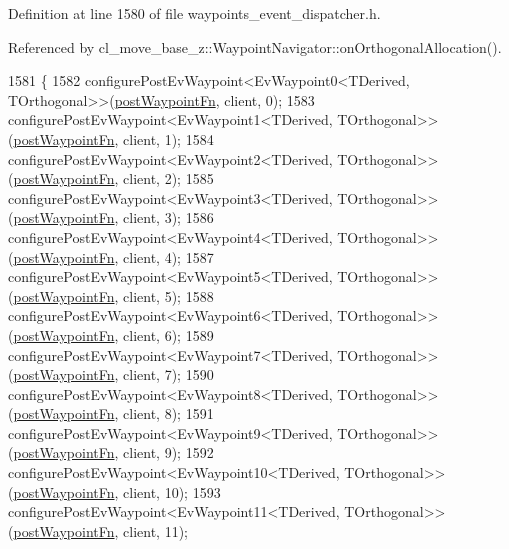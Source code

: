 Definition at line 1580 of file waypoints\+\_\+event\+\_\+dispatcher.\+h.



Referenced by cl\+\_\+move\+\_\+base\+\_\+z\+::\+Waypoint\+Navigator\+::on\+Orthogonal\+Allocation().


\begin{DoxyCode}
1581 \{
1582     configurePostEvWaypoint<EvWaypoint0<TDerived, TOrthogonal>>(\hyperlink{classcl__move__base__z_1_1WaypointEventDispatcher_a964a57fcce5d48ec60243230722d8dd7}{postWaypointFn}, client, 0);
1583     configurePostEvWaypoint<EvWaypoint1<TDerived, TOrthogonal>>(\hyperlink{classcl__move__base__z_1_1WaypointEventDispatcher_a964a57fcce5d48ec60243230722d8dd7}{postWaypointFn}, client, 1);
1584     configurePostEvWaypoint<EvWaypoint2<TDerived, TOrthogonal>>(\hyperlink{classcl__move__base__z_1_1WaypointEventDispatcher_a964a57fcce5d48ec60243230722d8dd7}{postWaypointFn}, client, 2);
1585     configurePostEvWaypoint<EvWaypoint3<TDerived, TOrthogonal>>(\hyperlink{classcl__move__base__z_1_1WaypointEventDispatcher_a964a57fcce5d48ec60243230722d8dd7}{postWaypointFn}, client, 3);
1586     configurePostEvWaypoint<EvWaypoint4<TDerived, TOrthogonal>>(\hyperlink{classcl__move__base__z_1_1WaypointEventDispatcher_a964a57fcce5d48ec60243230722d8dd7}{postWaypointFn}, client, 4);
1587     configurePostEvWaypoint<EvWaypoint5<TDerived, TOrthogonal>>(\hyperlink{classcl__move__base__z_1_1WaypointEventDispatcher_a964a57fcce5d48ec60243230722d8dd7}{postWaypointFn}, client, 5);
1588     configurePostEvWaypoint<EvWaypoint6<TDerived, TOrthogonal>>(\hyperlink{classcl__move__base__z_1_1WaypointEventDispatcher_a964a57fcce5d48ec60243230722d8dd7}{postWaypointFn}, client, 6);
1589     configurePostEvWaypoint<EvWaypoint7<TDerived, TOrthogonal>>(\hyperlink{classcl__move__base__z_1_1WaypointEventDispatcher_a964a57fcce5d48ec60243230722d8dd7}{postWaypointFn}, client, 7);
1590     configurePostEvWaypoint<EvWaypoint8<TDerived, TOrthogonal>>(\hyperlink{classcl__move__base__z_1_1WaypointEventDispatcher_a964a57fcce5d48ec60243230722d8dd7}{postWaypointFn}, client, 8);
1591     configurePostEvWaypoint<EvWaypoint9<TDerived, TOrthogonal>>(\hyperlink{classcl__move__base__z_1_1WaypointEventDispatcher_a964a57fcce5d48ec60243230722d8dd7}{postWaypointFn}, client, 9);
1592     configurePostEvWaypoint<EvWaypoint10<TDerived, TOrthogonal>>(\hyperlink{classcl__move__base__z_1_1WaypointEventDispatcher_a964a57fcce5d48ec60243230722d8dd7}{postWaypointFn}, client, 10);
1593     configurePostEvWaypoint<EvWaypoint11<TDerived, TOrthogonal>>(\hyperlink{classcl__move__base__z_1_1WaypointEventDispatcher_a964a57fcce5d48ec60243230722d8dd7}{postWaypointFn}, client, 11);

\end{DoxyCode}
